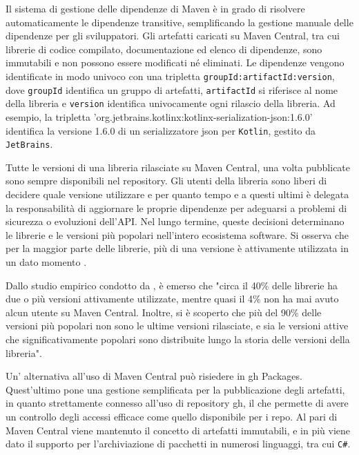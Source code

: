\documentclass[12pt,a4paper,openright,twoside]{book}
\begin{document}
Il sistema di gestione delle dipendenze di Maven è in grado di risolvere automaticamente le dipendenze transitive,
semplificando la gestione manuale delle dipendenze per gli sviluppatori. 
Gli artefatti caricati su Maven Central, tra cui librerie di codice compilato, documentazione ed elenco di dipendenze,
sono immutabili e non possono essere modificati né eliminati.
Le dipendenze vengono identificate in modo univoco con una tripletta \texttt{groupId:artifactId:version},
dove \texttt{groupId} identifica un gruppo di artefatti, \texttt{artifactId} si riferisce al nome della libreria
e \texttt{version} identifica univocamente ogni rilascio della libreria.
Ad esempio, la tripletta 'org.jetbrains.kotlinx:kotlinx-serialization-json:1.6.0' 
identifica la versione 1.6.0 di un serializzatore json per \texttt{Kotlin}, gestito da \texttt{JetBrains}.

Tutte le versioni di una libreria rilasciate su Maven Central, una volta pubblicate sono sempre disponibili nel repository. 
Gli utenti della libreria sono liberi di decidere quale versione utilizzare e per quanto tempo e a questi ultimi è delegata la responsabilità di aggiornare le proprie dipendenze per 
adeguarsi a problemi di sicurezza o evoluzioni dell'API.
Nel lungo termine, queste decisioni determinano le librerie e le versioni più popolari nell'intero ecosistema software.
Si osserva che per la maggior parte delle librerie, più di una versione è attivamente utilizzata in un dato momento \cite{soto2019emergence}. 

Dallo studio empirico condotto da \cite{soto2019emergence}, è emerso che "circa il 40\% delle librerie ha due o più versioni attivamente utilizzate, 
mentre quasi il 4\% non ha mai avuto alcun utente su Maven Central. 
Inoltre, si è scoperto che più del 90\% delle versioni più popolari non sono le ultime versioni rilasciate, 
e sia le versioni attive che significativamente popolari sono distribuite lungo la storia delle versioni della libreria".

Un' alternativa all'uso di Maven Central può risiedere in \ac{gh} Packages. Quest'ultimo pone una gestione 
semplificata per la pubblicazione degli artefatti, in quanto strettamente connesso all'uso di repository \ac{gh},
il che permette di avere un controllo degli accessi efficace come quello disponibile per i repo.
Al pari di Maven Central viene mantenuto il concetto di artefatti immutabili, e in più viene dato il supporto
per l'archiviazione di pacchetti in numerosi linguaggi, tra cui \texttt{C\#}.
\end{document}
